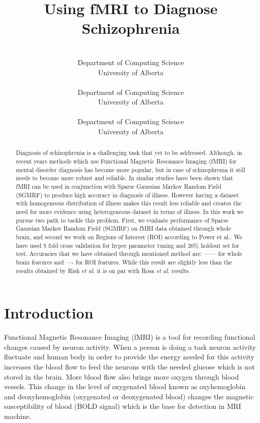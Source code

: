 \documentclass{article} %
\title{Using fMRI to Diagnose Schizophrenia}
\author{%
	\\
	Department of Computing Science\\
	University of Alberta\\
	\texttt{} 
\And 
 \\
Department of Computing Science\\
University of Alberta\\
\texttt{}
\And 
\\
Department of Computing Science\\
University of Alberta\\
\texttt{}  
}
\begin{document}
	\maketitle

\begin{abstract}
Diagnosis of schizophrenia is a challenging task that yet to be 
addressed\cite{McGuire200891}. Although, in recent years methods which use 
Functional Magnetic Resonance Imaging (fMRI) for mental disorder diagnosis has 
become more popular, but in case of schizophrenia it still needs to become 
more robust and reliable. In similar studies\cite{Rish_2013}\cite{Rosa_2013} 
have been shown that fMRI can be used in conjunction with Sparse Gaussian 
Markov Random Field (SGMRF) to produce high accuracy in diagnosis of illness. 
However having a dataset with homogeneous distribution of illness makes this 
result less reliable and creates the need for more evidence using 
heterogeneous dataset in terms of illness. In this work we pursue two path to 
tackle this problem. First, we evaluate performance of Sparse Gaussian Markov 
Random Field (SGMRF) on fMRI data obtained through whole brain, and second we 
work on Regions of Interest (ROI) according to Power et al.\cite{Power_2011}. 
We have used 5 fold cross validation for hyper parameter tuning and $20\%$ 
holdout set for test. Accuracies that we have obtained through mentioned 
method are: ------ for whole brain features and ---- for ROI features. While 
this result are slightly less than the results obtained by Rish \emph{et al.} 
it is on par with Rosa \emph{et al.} results.  
\end{abstract}


\section{Introduction}
Functional Magnetic Resonance Imaging (fMRI) is a tool for recording 
functional changes caused by neuron activity. When a person is doing a task 
neuron activity fluctuate and human body in order to provide the energy 
needed for this activity increases the blood flow to feed the neurons with 
the needed glucose which is not stored in the brain. More blood flow also 
brings more oxygen through blood vessels. This change in the level of 
oxygenated blood known as oxyhemoglobin and deoxyhemoglobin (oxygenated or 
deoxygenated blood) changes the magnetic susceptibility of blood (BOLD signal) 
which is the base for detection in MRI machine.  \\
\end{document}
